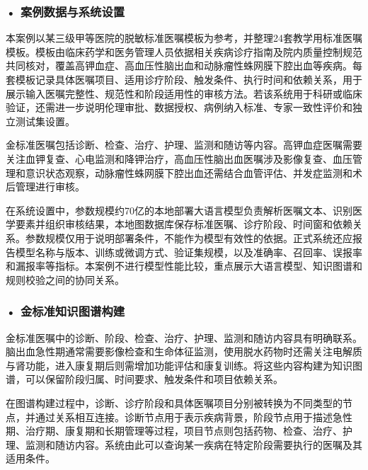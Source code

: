 \par
\noindent\begin{minipage}{\textwidth}
\centering
{}
\label{fig:ch10_04}
\end{minipage}
\par
\subsubsection*{\textbf{• 案例数据与系统设置}}

本案例以某三级甲等医院的脱敏标准医嘱模板为参考，并整理24套教学用标准医嘱模板。模板由临床药学和医务管理人员依据相关疾病诊疗指南及院内质量控制规范共同核对，覆盖高钾血症、高血压性脑出血和动脉瘤性蛛网膜下腔出血等疾病。每套模板记录具体医嘱项目、适用诊疗阶段、触发条件、执行时间和依赖关系，用于展示输入医嘱完整性、规范性和阶段适用性的审核方法。若该系统用于科研或临床验证，还需进一步说明伦理审批、数据授权、病例纳入标准、专家一致性评价和独立测试集设置。

金标准医嘱包括诊断、检查、治疗、护理、监测和随访等内容。高钾血症医嘱需要关注血钾复查、心电监测和降钾治疗，高血压性脑出血医嘱涉及影像复查、血压管理和意识状态观察，动脉瘤性蛛网膜下腔出血还需结合血管评估、并发症监测和术后管理进行审核。

在系统设置中，参数规模约70亿的本地部署大语言模型负责解析医嘱文本、识别医学要素并组织审核结果，本地图数据库保存标准医嘱、诊疗阶段、时间窗和依赖关系。参数规模仅用于说明部署条件，不能作为模型有效性的依据。正式系统还应报告模型名称与版本、训练或微调方式、验证集规模，以及准确率、召回率、误报率和漏报率等指标。本案例不进行模型性能比较，重点展示大语言模型、知识图谱和规则校验之间的协同关系。


\subsubsection*{\textbf{• 金标准知识图谱构建}}

金标准医嘱中的诊断、阶段、检查、治疗、护理、监测和随访内容具有明确联系。脑出血急性期通常需要影像检查和生命体征监测，使用脱水药物时还需关注电解质与肾功能，进入康复期后则需增加功能评估和康复训练。将这些内容构建为知识图谱，可以保留阶段归属、时间要求、触发条件和项目依赖关系。

在图谱构建过程中，诊断、诊疗阶段和具体医嘱项目分别被转换为不同类型的节点，并通过关系相互连接。诊断节点用于表示疾病背景，阶段节点用于描述急性期、治疗期、康复期和长期管理等过程，项目节点则包括药物、检查、治疗、护理、监测和随访内容。系统由此可以查询某一疾病在特定阶段需要执行的医嘱及其适用条件。

